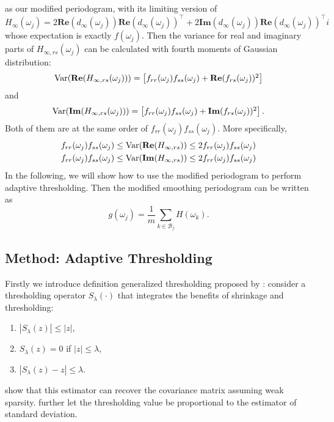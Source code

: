 as our modified periodogram, with its limiting version of
\begin{equation}
H_\infty(\omega_j) = 2\mathbf{Re}(d_{\infty}(\omega_j))  \mathbf{Re}(d_{\infty}(\omega_j))^\top+2\mathbf{Im}(d_{\infty}(\omega_j))  \mathbf{Re}(d_{\infty}(\omega_j))^\top i
\end{equation}
whose expectation is exactly $f(\omega_j)$. Then the variance for 
real and imaginary parts of $H_{\infty, rs}(\omega_j)$ can be calculated with fourth moments of Gaussian distribution: 
\begin{equation}
\begin{array}{cc}
\mathrm{Var}(\mathbf{Re}(H_{\infty, rs}(\omega_j))) = \left[f_{rr}(\omega_j)f_{ss}(\omega_j)+\mathbf{Re}(f_{rs}(\omega_j))^2\right]
\end{array}
\end{equation}
and 
\begin{equation}
\begin{array}{cc}
\mathrm{Var}(\mathbf{Im}(H_{\infty, rs}(\omega_j))) = \left[f_{rr}(\omega_j)f_{ss}(\omega_j)+\mathbf{Im}(f_{rs}(\omega_j))^2\right].
\end{array}
\end{equation}
Both of them are at the same order of $f_{rr}(\omega_j)f_{ss}(\omega_j)$. More specifically,
\begin{equation}
\begin{aligned}
& f_{rr}(\omega_j)f_{ss}(\omega_j)\le \mathrm{Var}({\bf Re}(H_{\infty, rs}))\le 2f_{rr}(\omega_j)f_{ss}(\omega_j) \\
& f_{rr}(\omega_j)f_{ss}(\omega_j)\le \mathrm{Var}({\bf Im}(H_{\infty, rs}))\le 2f_{rr}(\omega_j)f_{ss}(\omega_j)
\end{aligned}
\end{equation}
In the following, we will show how to use the modified periodogram to perform adaptive thresholding. Then the modified smoothing periodogram can be written as 
\begin{equation}
g(\omega_j) = \frac{1}{m}\sum_{k\in \mathcal{B}_j} H(\omega_k). 
\end{equation}



\subsection{Method: Adaptive Thresholding}
Firstly we introduce definition generalized thresholding proposed by \cite{rothman2009generalized}: consider a thresholding operator $S_\lambda(\cdot)$ that integrates the benefits of shrinkage and thresholding: 
\begin{enumerate}[(1)]
\item $|S_\lambda(z)|\le |z|$,
\item $S_\lambda(z) = 0$ if $|z|\le \lambda$,
\item $|S_\lambda(z)-z|\le \lambda $.
\end{enumerate}
\cite{rothman2009generalized} show that this estimator can recover the covariance matrix assuming weak sparsity. \cite{cai2011adaptive} further let the thresholding value be proportional to the estimator of standard deviation. 


